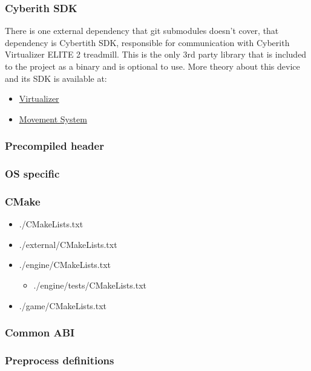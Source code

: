 \newpage
\subsubsection{Cyberith SDK}
There is one external dependency that git submodules doesn't cover, that dependency is Cybertith SDK, responsible for communication with Cyberith Virtualizer ELITE 2 treadmill.
This is the only 3rd party library that is included to the project as a binary and is optional to use.
More theory about this device and its SDK is available at:
\begin{itemize}
    \item \hyperref[]{Virtualizer} %
    \item \hyperref[sec:movement_system]{Movement System}
\end{itemize}

\newpage
\subsubsection{Precompiled header}

\newpage
\subsubsection{OS specific}
\label{sec:build_os}

\newpage
\subsubsection{CMake}
\begin{itemize}
    \item ./CMakeLists.txt
    \item ./external/CMakeLists.txt
    \item ./engine/CMakeLists.txt
        \begin{itemize}
            \item ./engine/tests/CMakeLists.txt
        \end{itemize}
    \item ./game/CMakeLists.txt
\end{itemize}

\newpage

\label{sec:abi}
\subsubsection{Common ABI}

\subsubsection{Preprocess definitions}

